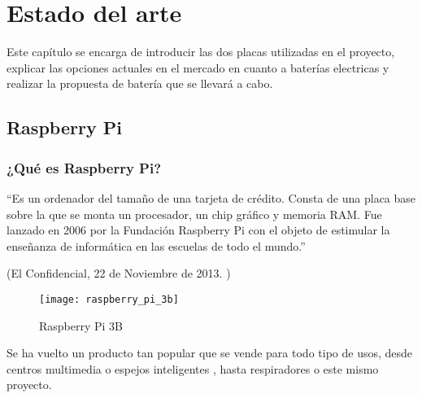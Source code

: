 
\chapter{Estado del arte} %
\label{sec:EstadoDelArte}

    Este capítulo se encarga de introducir las dos placas utilizadas en el proyecto, explicar las opciones actuales en
    el mercado en cuanto a baterías electricas y realizar la propuesta de batería que se llevará a cabo.

    \section{Raspberry Pi} %
    \label{sec:RaspberryPi}

        \subsection{¿Qué es Raspberry Pi?} %
        \label{sub:QueEsRaspberryPi}

            ``Es un ordenador del tamaño de una tarjeta de crédito. Consta de una placa base sobre la que se monta un
            procesador, un chip gráfico y memoria RAM. Fue lanzado en 2006 por la Fundación Raspberry Pi con el objeto
            de estimular la enseñanza de informática en las escuelas de todo el mundo.''

            \begin{flushright}
                (El Confidencial, 22 de Noviembre de 2013. \cite{confidencial_raspberry})
            \end{flushright}

            \begin{figure}[ht]
                \centering
                \texttt{[image: raspberry\_pi\_3b]}
                \caption{Raspberry Pi 3B \cite{imagen_raspberry_pi_3b}\label{fig:ImagenRaspberryPi3B}}
            \end{figure}

            Se ha vuelto un producto tan popular que se vende para todo tipo de usos, desde centros
            multimedia \cite{centro_multimedia_raspberry_pi} o espejos inteligentes \cite{espejo_raspberry_pi}, hasta
            respiradores \cite{github_respirador} o este mismo proyecto.

